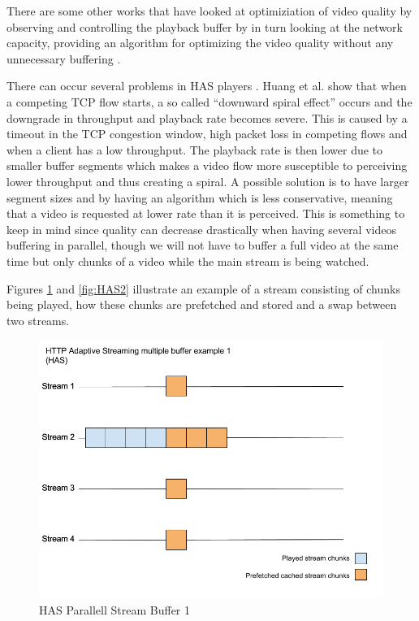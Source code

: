 There are some other works that have looked at optimiziation of video quality by observing and controlling the playback buffer by in turn looking at the network capacity, providing an algorithm for optimizing the video quality without any unnecessary buffering \cite{bufferbased}.

There can occur several problems in HAS players \cite{qualbranch}. Huang et al. \cite{streamrate} show that when a competing TCP flow starts, a so called “downward spiral effect” occurs and the downgrade in throughput and playback rate becomes severe. This is caused by a timeout in the TCP congestion window, high packet loss in competing flows and when a client has a low throughput. The playback rate is then lower due to smaller buffer segments which makes a video flow more susceptible to perceiving lower throughput and thus creating a spiral. A possible solution is to have larger segment sizes and by having an algorithm which is less conservative, meaning that a video is requested at lower rate than it is perceived. This is something to keep in mind since quality can decrease drastically when having several videos buffering in parallel, though we will not have to buffer a full video at the same time but only chunks of a video while the main stream is being watched.

Figures \ref{fig:HAS1} and \ref{fig:HAS2} illustrate an example of a stream consisting of chunks being played, how these chunks are prefetched and stored and a swap between two streams.

\begin{figure}[!ht]
\begin{center}
\includegraphics[scale=0.4]{HAS1.png}
\caption{HAS Parallell Stream Buffer 1}
\label{fig:HAS1}
\end{center}
\end{figure}

